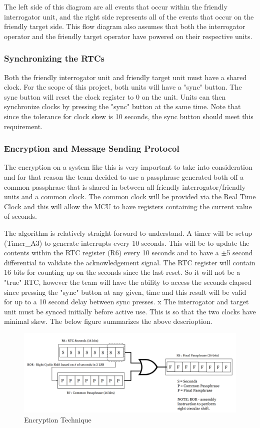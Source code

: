 \documentclass[letterpaper,10pt]{article}
\begin{document}
\begin{spacing}{1.15}
The left side of this diagram are all events that occur within the friendly interrogator unit, and the right side represents all of the events that occur on the friendly target side. This flow diagram also assumes that both the interrogator operator and the friendly target operator have powered on their respective units.

\subsubsection{Synchronizing the RTCs}
Both the friendly interrogator unit and friendly target unit must have a shared clock. For the scope of this project, both units will have a "sync" button. The sync button will reset the clock register to 0 on the unit. Units can then synchronize clocks by pressing the "sync" button at the same time. Note that since the tolerance for clock skew is 10 seconds, the sync button should meet this requirement. 

\subsubsection{Encryption and Message Sending Protocol}
The encryption on a system like this is very important to take into consideration and for that reason the team decided to use a passphrase generated both off a common passphrase that is shared in between all friendly interrogator/friendly units and a common clock. The common clock will be provided via the Real Time Clock and this will allow the MCU to have registers containing the current value of seconds. 

The algorithm is relatively straight forward to understand. A timer will be setup (Timer\_A3) to generate interrupts every 10 seconds. This will be to update the contents within the RTC register (R6) every 10 seconds and to have a $\pm$5 second differential to validate the acknowledgement signal. The RTC register will contain 16 bits for counting up on the seconds since the last reset. So it will not be a "true" RTC, however the team will have the ability to access the seconds elapsed since pressing the "sync" button at any given, time and this result will be valid for up to a 10 second delay between sync presses.
x
The interrogator and target unit must be synced initially before active use. This is so that the two clocks have minimal skew. The below figure summarizes the above descrioption.
\begin{figure} [H]
	\centering
	\includegraphics[scale=0.45]{Encryption_Diagram.png}
	\caption{Encryption Technique\label{fig:encryption}}
\end{figure}


\end{spacing}
\end{document}

